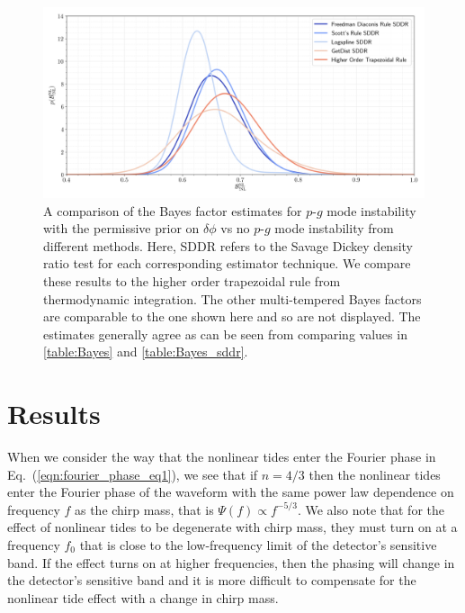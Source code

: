 \begin{figure}[th]
\centering
\includegraphics[width=1.0\textwidth]{figs/chapter6/sddr_bayes_factor.png}
\caption{A comparison of the Bayes factor estimates for $p$-$g$ mode instability with the permissive prior on $\delta \phi$ vs no $p$-$g$ mode instability from different methods. Here, SDDR refers to the Savage Dickey density ratio test for each corresponding estimator technique. We compare these results to the higher order trapezoidal rule from thermodynamic integration. The other multi-tempered Bayes factors are comparable to the one shown here and so are not displayed. The estimates generally agree as can be seen from comparing values in \ref{table:Bayes} and \ref{table:Bayes_sddr}.}
\label{fig:sddr_bayes_factor_comparisons}
\end{figure}


\section{Results}
When we consider the way that the nonlinear tides enter the Fourier phase in Eq.~(\ref{eqn:fourier_phase_eq1}), we see that if $n = 4/3$ then the nonlinear tides enter the Fourier phase of the waveform with the same power law dependence on frequency $f$ as the chirp mass, that is $\Psi(f) \propto f^{-5/3}$. We also note that for the effect of nonlinear tides to be degenerate with chirp mass, they must turn on at a frequency $f_0$ that is close to the low-frequency limit of the detector's sensitive band. If the effect turns on at higher frequencies, then the phasing will change in the detector's sensitive band and it is more difficult to compensate for the nonlinear tide effect with a change in chirp mass. 

